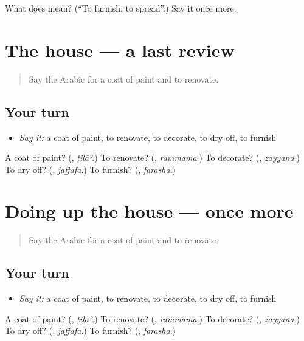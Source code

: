 \begin{tcolorbox}[breakable,colback=teal!4,colframe=teal!35!black,title={Before you move on}]
What does  mean? (\textquotedblleft{}To furnish; to spread\textquotedblright{}.) Say it once more.
\end{tcolorbox}
\section[(dialogue)]{The house — a last review}

\label{lesson:AR-R552-review-552-552}



\begin{quote}
Say the Arabic for a coat of paint and to renovate.
\end{quote}

\subsection*{Your turn}
\begin{itemize}
\raggedright
  \item \emph{Say it:} a coat of paint, to renovate, to decorate, to dry off, to furnish
\end{itemize}

\begin{tcolorbox}[breakable,colback=teal!4,colframe=teal!35!black,title={Before you move on}]
A coat of paint? (\textbf{}, \emph{ṭilāʾ}.) To renovate? (\textbf{}, \emph{rammama}.) To decorate? (\textbf{}, \emph{zayyana}.) To dry off? (\textbf{}, \emph{jaffafa}.) To furnish? (\textbf{}, \emph{farasha}.)
\end{tcolorbox}
\section[(dialogue)]{Doing up the house — once more}

\label{lesson:AR-R552-review-final-552}



\begin{quote}
Say the Arabic for a coat of paint and to renovate.
\end{quote}

\subsection*{Your turn}
\begin{itemize}
\raggedright
  \item \emph{Say it:} a coat of paint, to renovate, to decorate, to dry off, to furnish
\end{itemize}

\begin{tcolorbox}[breakable,colback=teal!4,colframe=teal!35!black,title={Before you move on}]
A coat of paint? (\textbf{}, \emph{ṭilāʾ}.) To renovate? (\textbf{}, \emph{rammama}.) To decorate? (\textbf{}, \emph{zayyana}.) To dry off? (\textbf{}, \emph{jaffafa}.) To furnish? (\textbf{}, \emph{farasha}.)
\end{tcolorbox}

